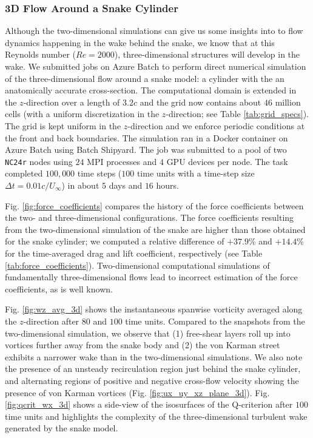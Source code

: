 \documentclass[10pt,journal,compsoc]{IEEEtran}
\begin{document}
\subsubsection{3D Flow Around a Snake Cylinder}

Although the two-dimensional simulations can give us some insights into to flow dynamics happening in the wake behind the snake, we know that at this Reynolds number ($Re = 2000$), three-dimensional structures will develop in the wake.
We submitted jobs on Azure Batch to perform direct numerical simulation of the three-dimensional flow around a snake model: a cylinder with the an anatomically accurate cross-section.
The computational domain is extended in the $z$-direction over a length of $3.2c$ and the grid now contains about $46$ million cells (with a uniform discretization in the $z$-direction; see Table \ref{tab:grid_specs}).
The grid is kept uniform in the $z$-direction and we enforce periodic conditions at the front and back boundaries.
The simulation ran in a Docker container on Azure Batch using Batch Shipyard.
The job was submitted to a pool of two \texttt{NC24r} nodes using $24$ MPI processes and $4$ GPU devices per node.
The task completed $100,000$ time steps ($100$ time units with a time-step size $\Delta t = 0.01 c / U_\infty$) in about $5$ days and $16$ hours.

Fig. \ref{fig:force_coefficients} compares the history of the force coefficients between the two- and three-dimensional configurations.
The force coefficients resulting from the two-dimensional simulation of the snake are higher than those obtained for the snake cylinder; we computed a relative difference of $+37.9\%$ and $+14.4\%$ for the time-averaged drag and lift coefficient, respectively (see Table \ref{tab:force_coefficients}).
Two-dimensional computational simulations of fundamentally three-dimensional flows lead to incorrect estimation of the force coefficients, as is well known\cite{mittal_balachandar_1995}.

Fig. \ref{fig:wz_avg_3d} shows the instantaneous spanwise vorticity averaged along the $z$-direction after $80$ and $100$ time units.
Compared to the snapshots from the two-dimensional simulation, we observe that (1) free-shear layers roll up into vortices further away from the snake body and (2) the von Karman street exhibits a narrower wake than in the two-dimensional simulations.
We also note the presence of an unsteady recirculation region just behind the snake cylinder, and alternating regions of positive and negative cross-flow velocity showing the presence of von Karman vortices (Fig. \ref{fig:ux_uy_xz_plane_3d}).
Fig. \ref{fig:qcrit_wx_3d} shows a side-view of the isosurfaces of the Q-criterion after $100$ time units and highlights the complexity of the three-dimensional turbulent wake generated by the snake model.
\end{document}
